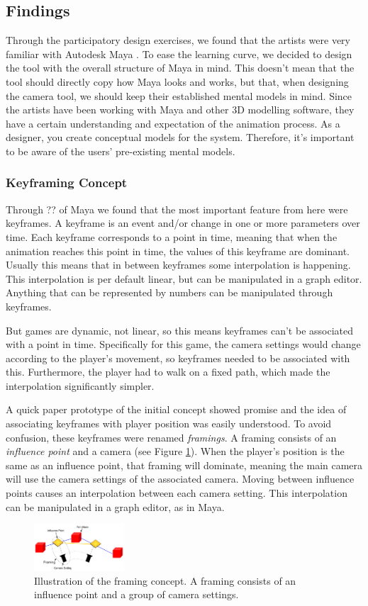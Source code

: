 \subsection{Findings}
Through the participatory design exercises, we found that the artists were very familiar with Autodesk Maya \cite{MayaSource}. To ease the learning curve, we decided to design the tool with the overall structure of Maya in mind. This doesn't mean that the tool should directly copy how Maya looks and works, but that, when designing the camera tool, we should keep their established mental models \cite{mentalModels} in mind. Since the artists have been working with Maya and other 3D modelling software, they have a certain understanding and expectation of the animation process. As a designer, you create conceptual models for the system. Therefore, it's important to be aware of the users' pre-existing mental models.

\subsubsection{Keyframing Concept}
Through ?? of Maya we found that the most important feature from here were keyframes.
A keyframe is an event and/or change in one or more parameters over time. Each keyframe corresponds to a point in time, meaning that when the animation reaches this point in time, the values of this keyframe are dominant. Usually this means that in between keyframes some interpolation is happening. This interpolation is per default linear, but can be manipulated in a graph editor. Anything that can be represented by numbers can be manipulated through keyframes.

But games are dynamic, not linear, so this means keyframes can't be associated with a point in time. Specifically for this game, the camera settings would change according to the player's movement, so keyframes needed to be associated with this. Furthermore, the player had to walk on a fixed path, which made the interpolation significantly simpler.

A quick paper prototype of the initial concept showed promise and the idea of associating keyframes with player position was easily understood. To avoid confusion, these keyframes were renamed \textit{framings}. A framing consists of an \textit{influence point} and a camera (see Figure \ref{fig:framingConcept}). When the player's position is the same as an influence point, that framing will dominate, meaning the main camera will use the camera settings of the associated camera. Moving between influence points causes an interpolation between each camera setting. This interpolation can be manipulated in a graph editor, as in Maya.

\begin{figure}[htbp]
\centering
\includegraphics[width=0.3\textwidth]{Pics/Instructions}
\caption{Illustration of the framing concept. A framing consists of an influence point and a group of camera settings.}
\label{fig:framingConcept}
\end{figure}
